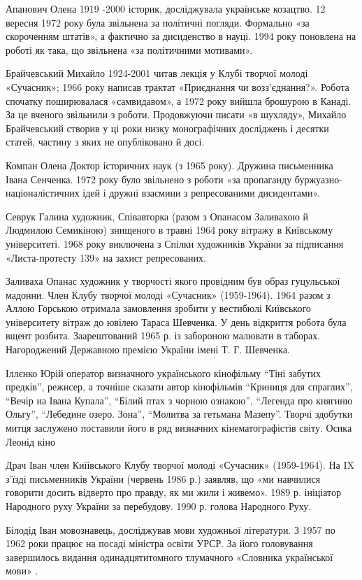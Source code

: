 Апанович Олена 1919 -2000 історик, досліджувала українське козацтво. 12 вересня 1972 року була звільнена за політичні погляди. Формально «за скороченням штатів», а фактично за дисиденство в науці. 1994 року поновлена на роботі як така, що звільнена «за політичними мотивами».

Брайчевський Михайло 1924-2001 читав лекція у Клубі творчої молоді «Сучасник»; 1966 року написав трактат «Приєднання чи возз'єднання?». Робота спочатку поширювалася «самвидавом», а 1972 року вийшла брошурою в Канаді. За це вченого звільнили з роботи. Продовжуючи писати «в шухляду», Михайло Брайчевський створив у ці роки низку монографічних досліджень і десятки статей, частину з яких не опубліковано й досі.

Компан Олена Доктор історичних наук (з 1965 року). Дружина письменника Івана Сенченка. 1972 року було звільнено з роботи «за пропаганду буржуазно-націоналістичних ідей і дружні взаємини з репресованими дисидентами».

Севрук Галина художник, Співавторка (разом з Опанасом Заливахою й Людмилою Семикіною) знищеного в травні 1964 року вітражу в Київському університеті. 1968 року виключена з Спілки художників України за підписання «Листа-протесту 139» на захист репресованих.

Заливаха Опанас художник у творчості якого провідним був образ гуцульської мадонни. Член Клубу творчої молоді «Сучасник» (1959-1964). 1964 разом з Аллою Горською отримала замовлення зробити у вестибюлі Київського університету вітраж до ювілею Тараса Шевченка. У день відкриття робота була вщент розбита. Заарештований 1965 р. із забороною малювати в таборах. Нагороджений Державною премією України імені Т. Г. Шевченка.

Іллєнко Юрій оператор визначного українського кінофільму “Тіні забутих предків”, режисер, а точніше сказати автор кінофільмів “Криниця для спраглих”, “Вечір на Івана Купала”, “Білий птах з чорною ознакою”, “Легенда про княгиню Ольгу”, “Лебедине озеро. Зона”, “Молитва за гетьмана Мазепу”. Творчі здобутки митця заслужено поставили його в ряд визначних кінематографістів світу. Осика Леонід кіно

Драч Іван член Киїівського Клубу творчої молоді «Сучасник» (1959-1964). На IX з'їзді письменників України (червень 1986 р.) заявляв, що «ми навчилися говорити досить відверто про правду, як ми жили і живемо». 1989 р. ініціатор Народного руху України за перебудову. 1990 р. голова Народного Руху.

Білодід Іван мовознавець, досліджував мови художньої літератури. З 1957 по 1962 роки працює на посаді міністра освіти УРСР. За його головування завершилось видання одинадцятитомного тлумачного «Словника української мови» .

